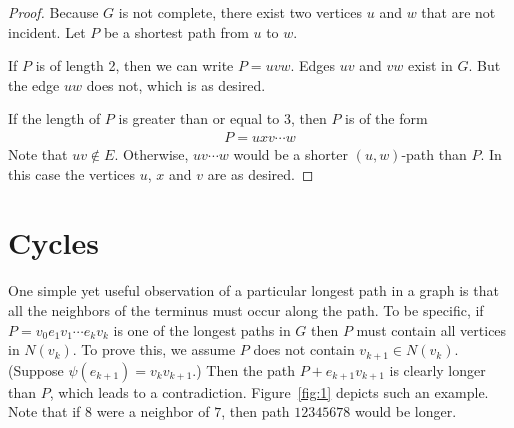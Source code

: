 \documentclass[thmcnt=section, 12pt, color=cyan]{my-elegantbook}
\begin{document}
\begin{proof}
	Because $G$ is not complete, 
	there exist two vertices $u$ and $w$ that are not incident.
	Let $P$ be a shortest path from $u$ to $w$.
	
	If $P$ is of length 2, then we can write 
	$P = u v w$.
	Edges $uv$ and $vw$ exist in $G$. 
	But the edge $uw$ does not, which is as desired.

	If the length of $P$ is greater than or equal to $3$, 
	then $P$ is of the form 
	\begin{align*}
		P = u x v \cdots w 
	\end{align*}
	Note that $uv \notin E$. 
	Otherwise, $u v \cdots w$ would be 
	a shorter $(u,w)$-path than $P$.
	In this case the vertices $u$, $x$ and $v$ are as desired.
\end{proof}


\section{Cycles}


One simple yet useful observation of a particular longest path 
in a graph is that all the neighbors of the terminus must 
occur along the path. To be specific, 
if $P = v_0 e_1 v_1 \cdots e_k v_k$ is one of the longest paths in $G$ 
then $P$ must contain all vertices in $N(v_k)$. 
To prove this, we assume $P$ does not contain $v_{k+1} \in N(v_k)$. 
(Suppose $\psi(e_{k+1}) = v_k v_{k+1}$.) 
Then the path $P + e_{k+1}v_{k+1}$ is clearly longer than $P$, 
which leads to a contradiction. 
Figure~\ref{fig:1} depicts such an example. 
Note that if $8$ were a neighbor of $7$, 
then path $12345678$ would be longer.
\end{document}
